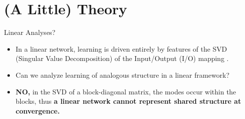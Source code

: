 \documentclass{beamer}
\begin{document}
\section{(A Little) Theory}
\begin{frame}{Linear Analyses?}
\begin{itemize}
    \item<1-> In a linear network, learning is driven entirely by features of the SVD (Singular Value Decomposition) of the Input/Output (I/O) mapping \cite{Saxe2013}.
    \item<2-> Can we analyze learning of analogous structure in a linear framework?
    \item<3-> \textbf{NO,} in the SVD of a block-diagonal matrix, the modes occur within the blocks, thus \textbf{a linear network cannot represent shared structure at convergence.}
\end{itemize}
\end{frame}
\end{document}
